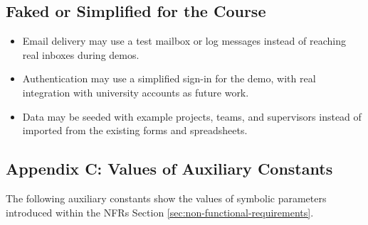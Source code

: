 \documentclass[12pt]{article}
\newcounter{tin}
\begin{document}
  \subsection{Faked or Simplified for the Course}
  \begin{itemize}
    \item Email delivery may use a test mailbox or log messages instead of
    reaching real inboxes during demos.
    \item Authentication may use a simplified sign-in for the demo, with real
    integration with university accounts as future work.
    \item Data may be seeded with example projects, teams, and supervisors
    instead of imported from the existing forms and spreadsheets.
  \end{itemize}

  \subsection{Appendix C: Values of Auxiliary Constants}




  The following auxiliary constants show the values of symbolic parameters introduced within the NFRs Section \ref{sec:non-functional-requirements}. 
\end{document}
